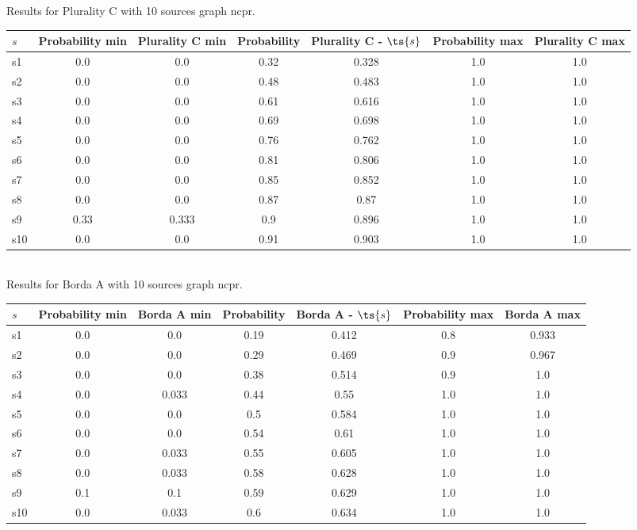 \documentclass{article}
\begin{document}
\noindent Results for Plurality C with 10 sources graph ncpr.

\noindent\begin{tabular}{|l|c|c|c|c|c|c|}
\hline
$s$& Probability min & Plurality C min & Probability & Plurality C - $\ts{s}$ & Probability max & Plurality C max\\
\hline
s1 &0.0 & 0.0 & 0.32 & 0.328 & 1.0 & 1.0\\
\hline
s2 &0.0 & 0.0 & 0.48 & 0.483 & 1.0 & 1.0\\
\hline
s3 &0.0 & 0.0 & 0.61 & 0.616 & 1.0 & 1.0\\
\hline
s4 &0.0 & 0.0 & 0.69 & 0.698 & 1.0 & 1.0\\
\hline
s5 &0.0 & 0.0 & 0.76 & 0.762 & 1.0 & 1.0\\
\hline
s6 &0.0 & 0.0 & 0.81 & 0.806 & 1.0 & 1.0\\
\hline
s7 &0.0 & 0.0 & 0.85 & 0.852 & 1.0 & 1.0\\
\hline
s8 &0.0 & 0.0 & 0.87 & 0.87 & 1.0 & 1.0\\
\hline
s9 &0.33 & 0.333 & 0.9 & 0.896 & 1.0 & 1.0\\
\hline
s10 &0.0 & 0.0 & 0.91 & 0.903 & 1.0 & 1.0\\
\hline
\end{tabular}\\

\noindent Results for Borda A with 10 sources graph ncpr.

\noindent\begin{tabular}{|l|c|c|c|c|c|c|}
\hline
$s$& Probability min & Borda A min & Probability & Borda A - $\ts{s}$ & Probability max & Borda A max\\
\hline
s1 &0.0 & 0.0 & 0.19 & 0.412 & 0.8 & 0.933\\
\hline
s2 &0.0 & 0.0 & 0.29 & 0.469 & 0.9 & 0.967\\
\hline
s3 &0.0 & 0.0 & 0.38 & 0.514 & 0.9 & 1.0\\
\hline
s4 &0.0 & 0.033 & 0.44 & 0.55 & 1.0 & 1.0\\
\hline
s5 &0.0 & 0.0 & 0.5 & 0.584 & 1.0 & 1.0\\
\hline
s6 &0.0 & 0.0 & 0.54 & 0.61 & 1.0 & 1.0\\
\hline
s7 &0.0 & 0.033 & 0.55 & 0.605 & 1.0 & 1.0\\
\hline
s8 &0.0 & 0.033 & 0.58 & 0.628 & 1.0 & 1.0\\
\hline
s9 &0.1 & 0.1 & 0.59 & 0.629 & 1.0 & 1.0\\
\hline
s10 &0.0 & 0.033 & 0.6 & 0.634 & 1.0 & 1.0\\
\hline
\end{tabular}\\
\end{document}
